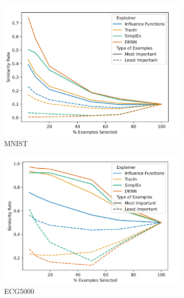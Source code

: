 \begin{figure}
     \centering
     \begin{subfigure}[b]{0.3\textwidth}
         \centering
         \includegraphics[width=\textwidth]{images/example_consistency_mnist.png}
         \caption{MNIST}
         \label{fig:mnist1}
     \end{subfigure}
     \hfill
     \begin{subfigure}[b]{0.3\textwidth}
         \centering
         \includegraphics[width=\textwidth]{images/example_consistency_ecg.png}
         \caption{ECG5000}
         \label{fig:ecg1}
     \end{subfigure}
     \hfill
     \begin{subfigure}[b]{0.3\textwidth}

\end{subfigure}
\end{figure}

